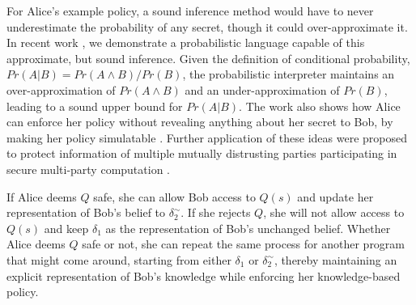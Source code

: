 \documentclass{article} %
\newcommand{\pxm}[1]{}
\newcommand{\sconst}[1]{\ensuremath{\mathsf{#1}}}
\newcommand{\strue}{\sconst{True}}
\newcommand{\sfalse}{\sconst{False}}
\newcommand{\paren}[1]{\left( #1 \right)}
\newcommand{\acond}[0]{|^\sim}
\newcommand{\stacklabel}[1]{\stackrel{\smash{\scriptscriptstyle \mathrm{#1}}}}
\newcommand{\defeq}{\stacklabel{def}=}
\theoremstyle{plain} %
\theoremstyle{definition} %
\begin{document}
For Alice's example policy, a sound inference method would have to
never underestimate the probability of any secret, though it could
over-approximate it. In recent work \cite{mardziel11belief}, we
demonstrate a probabilistic language capable of this approximate, but
sound inference. Given the definition of conditional probability, $
Pr(A | B) = Pr(A \wedge B) / Pr(B) $, the probabilistic interpreter
maintains an over-approximation of $ Pr(A \wedge B) $ and an
under-approximation of $ Pr(B) $, leading to a sound upper bound for $
Pr(A | B) $. The work also shows how Alice can enforce her policy
without revealing anything about her secret to Bob, by making her
policy simulatable \cite{kenthapadi05simulatable}. Further application
of these ideas were proposed to protect information of multiple
mutually distrusting parties participating in secure multi-party
computation \cite{mardziel12smc}.

%
%

%

If Alice deems $ Q $ safe, she can allow Bob access to $ Q(s) $
and update her representation of Bob's belief to $
\delta_2^\sim $. If she rejects $ Q $, she will not allow access to $ Q(s) $ and keep
$ \delta_1 $ as the representation of Bob's unchanged belief. Whether
Alice deems $ Q $ safe or not, she can repeat the same process for
another program that might come around, starting from either $ \delta_1
$ or $ \delta_2^\sim $, thereby maintaining an explicit representation
of Bob's knowledge while enforcing her knowledge-based policy.
\end{document}

